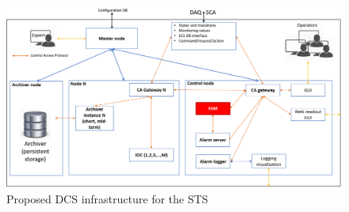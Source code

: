 \begin{figure}[!h]
\centering
\includegraphics[width=1\columnwidth]{Chapter3/Controls/images/DCS.png}
\caption{Proposed \gls{DCS} infrastructure for the \gls{STS}}
\label{fig_arch}
\end{figure}
\newpage





